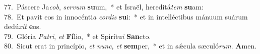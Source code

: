{77.~}Páscere Ja\textit{cob}, \textit{ser}\textit{vum} \textbf{su}um,~* et Israël, hereditá\textit{tem} \textbf{su}am:\\
{78.~}Et pavit eos in innocénti\textit{a} \textit{cor}\textit{dis} \textbf{su}i:~* et in intelléctibus mánuum suárum dedú\textit{xit} \textbf{e}os.\\
{79.~}Glória \textit{Pa}\textit{tri}, \textit{et} \textbf{Fí}lio,~* et Spirítu\textit{i} \textbf{San}cto.\\
{80.~}Sicut erat in princípio, \textit{et} \textit{nunc}, \textit{et} \textbf{sem}per,~* et in sǽcula sæculó\textit{rum}. \textbf{A}men.\\
